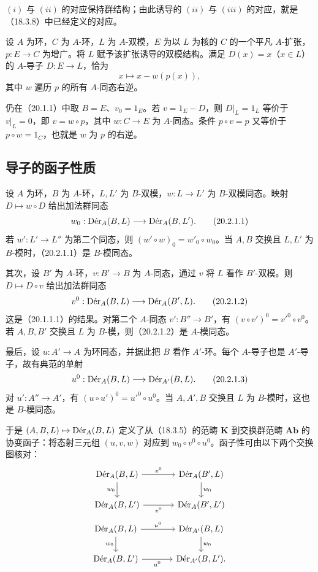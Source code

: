$(i)$ 与 $(ii)$ 的对应保持群结构；由此诱导的 $(ii)$ 与 $(iii)$ 的对应，就是（18.3.8）中已经定义的对应。

设 $A$ 为环，$C$ 为 $A$-环，$L$ 为 $A$-双模，$E$ 为以 $L$ 为核的 $C$ 的一个平凡 $A$-扩张，$p:E\to C$ 为增广。将 $L$ 赋予该扩张诱导的双模结构。满足 $D(x)=x$（$x\in L$）的 $A$-导子 $D:E\to L$，恰为
\[
 x\longmapsto x-w(p(x)),
\]
其中 $w$ 遍历 $p$ 的所有 $A$-同态右逆。

仍在（20.1.1）中取 $B=E$、$v_0=1_E$。若 $v=1_E-D$，则 $D|_L=1_L$ 等价于 $v|_L=0$，即 $v=w\circ p$，其中 $w:C\to E$ 为 $A$-同态。条件 $p\circ v=p$ 又等价于 $p\circ w=1_C$，也就是 $w$ 为 $p$ 的右逆。

\subsection{导子的函子性质}
设 $A$ 为环，$B$ 为 $A$-环，$L,L'$ 为 $B$-双模，$w:L\to L'$ 为 $B$-双模同态。映射 $D\mapsto w\circ D$ 给出加法群同态
\begin{equation}
 w_0:\Der_A(B,L)\longrightarrow\Der_A(B,L').
 \tag{20.2.1.1}
\end{equation}
若 $w':L'\to L''$ 为第二个同态，则 $(w'\circ w)_0=w'_0\circ w_0$。当 $A,B$ 交换且 $L,L'$ 为 $B$-模时，（20.2.1.1）是 $B$-模同态。

其次，设 $B'$ 为 $A$-环，$v:B'\to B$ 为 $A$-同态，通过 $v$ 将 $L$ 看作 $B'$-双模。则 $D\mapsto D\circ v$ 给出加法群同态
\begin{equation}
 v^0:\Der_A(B,L)\longrightarrow\Der_A(B',L).
 \tag{20.2.1.2}
\end{equation}
这是（20.1.1.1）的结果。对第二个 $A$-同态 $v':B''\to B'$，有 $(v\circ v')^0=v'^0\circ v^0$。若 $A,B,B'$ 交换且 $L$ 为 $B$-模，则（20.2.1.2）是 $A$-模同态。

最后，设 $u:A'\to A$ 为环同态，并据此把 $B$ 看作 $A'$-环。每个 $A$-导子也是 $A'$-导子，故有典范的单射
\begin{equation}
 u^0:\Der_A(B,L)\longrightarrow\Der_{A'}(B,L).
 \tag{20.2.1.3}
\end{equation}
对 $u':A''\to A'$，有 $(u\circ u')^0=u'^0\circ u^0$。当 $A,A',B$ 交换且 $L$ 为 $B$-模时，这也是 $B$-模同态。

于是 $(A,B,L)\mapsto\Der_A(B,L)$ 定义了从（18.3.5）的范畴 $\boldsymbol K$ 到交换群范畴 $\mathbf{Ab}$ 的协变函子：将态射三元组 $(u,v,w)$ 对应到 $w_0\circ v^0\circ u^0$。函子性可由以下两个交换图核对：
\[
\begin{tikzcd}[column sep=large]
 \Der_A(B,L)\arrow[r,"v^0"]\arrow[d,"w_0"']&\Der_A(B',L)\arrow[d,"w_0"]\\
 \Der_A(B,L')\arrow[r,"v^0"']&\Der_A(B',L')
\end{tikzcd}
\]
\[
\begin{tikzcd}[column sep=large]
 \Der_A(B,L)\arrow[r,"u^0"]\arrow[d,"w_0"']&\Der_{A'}(B,L)\arrow[d,"w_0"]\\
 \Der_A(B,L')\arrow[r,"u^0"']&\Der_{A'}(B,L').
\end{tikzcd}
\]

